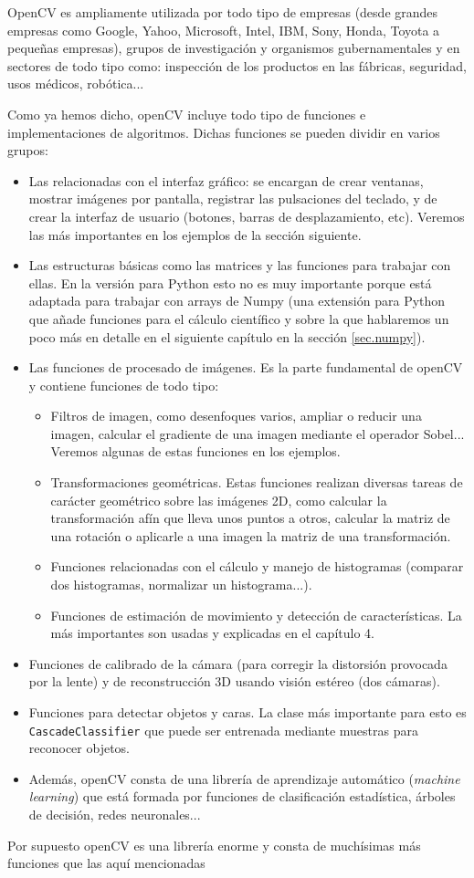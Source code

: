 \documentclass[a4paper,openright, 12pt]{book}
\begin{document}
OpenCV es ampliamente utilizada por todo tipo de empresas (desde grandes empresas como Google, Yahoo, Microsoft, Intel, IBM, Sony, Honda, Toyota a pequeñas empresas), grupos de investigación y organismos gubernamentales y en sectores de todo tipo como: inspección de los productos en las fábricas, seguridad, usos médicos, robótica...

Como ya hemos dicho, openCV incluye todo tipo de funciones e implementaciones de algoritmos. 
Dichas funciones se pueden dividir en varios grupos:
\begin{itemize}
\item Las relacionadas con el interfaz gráfico: se encargan de crear ventanas, mostrar imágenes por pantalla, registrar las pulsaciones del teclado, y de crear la interfaz de usuario (botones, barras de desplazamiento, etc). Veremos las más importantes en los ejemplos de la sección siguiente.
\item Las estructuras básicas como las matrices y las funciones para trabajar con ellas. En la versión para Python esto no es muy importante porque está adaptada para trabajar con arrays de Numpy\cite{numpyrefman} (una extensión para Python que añade funciones para el cálculo científico y sobre la que hablaremos un poco más en detalle en el siguiente capítulo en la sección \ref{sec.numpy}).
\item Las funciones de procesado de imágenes. Es la parte fundamental de openCV y contiene funciones de todo tipo: 
\begin{itemize}
\item Filtros de imagen, como desenfoques varios, ampliar o reducir una imagen, calcular el gradiente de una imagen mediante el operador Sobel...
\newline Veremos algunas de estas funciones en los ejemplos.
\item Transformaciones geométricas. Estas funciones realizan diversas tareas de carácter geométrico sobre las imágenes 2D, como calcular la transformación afín que lleva unos puntos a otros, calcular la matriz de una rotación o aplicarle a una imagen la matriz de una transformación.
\item Funciones relacionadas con el cálculo y manejo de histogramas (comparar dos histogramas, normalizar un histograma...).
\item Funciones de estimación de movimiento y detección de características. La más importantes son usadas y explicadas en el capítulo 4.
\end{itemize}
\item Funciones de calibrado de la cámara (para corregir la distorsión provocada por la lente) y de reconstrucción 3D usando visión estéreo (dos cámaras).
\item Funciones para detectar objetos y caras. La clase más importante para esto es \lstinline|CascadeClassifier| que puede ser entrenada mediante muestras para reconocer objetos.
\item Además, openCV consta de una librería de aprendizaje automático (\textit{machine learning}) que está formada por funciones de clasificación estadística, árboles de decisión, redes neuronales...
\end{itemize}
Por supuesto openCV es una librería enorme y consta de muchísimas más funciones que las aquí mencionadas\newpage
\end{document}
